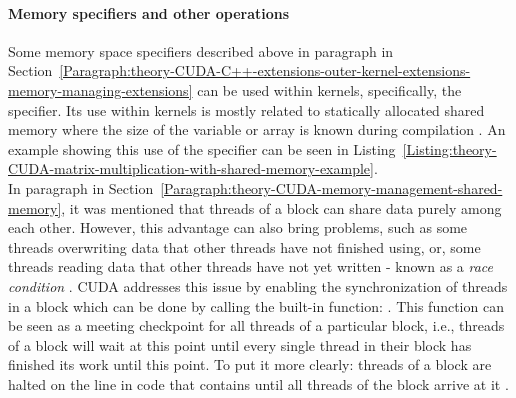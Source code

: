 \paragraph{Memory specifiers and other operations}
Some memory space specifiers described above in paragraph \textit{} in Section~\ref{Paragraph:theory-CUDA-C++-extensions-outer-kernel-extensions-memory-managing-extensions} can be used within kernels, specifically, the  specifier. Its use within kernels is mostly related to statically allocated shared memory where the size of the variable or array is known during compilation \cite{NVIDIAMay2022}. An example showing this use of the specifier can be seen in Listing~\ref{Listing:theory-CUDA-matrix-multiplication-with-shared-memory-example}. \\
In paragraph \textit{} in Section~\ref{Paragraph:theory-CUDA-memory-management-shared-memory}, it was mentioned that threads of a block can share data purely among each other. However, this advantage can also bring problems, such as some threads overwriting data that other threads have not finished using, or, some threads reading data that other threads have not yet written - known as a \textit{race condition} \cite{Harris28January2013}. CUDA addresses this issue by enabling the synchronization of threads in a block which can be done by calling the built-in function: . This function can be seen as a meeting checkpoint for all threads of a particular block, i.e., threads of a block will wait at this point until every single thread in their block has finished its work until this point. To put it more clearly: threads of a block are halted on the line in code that contains  until all threads of the block arrive at it \cite{NVIDIAMay2022}.


